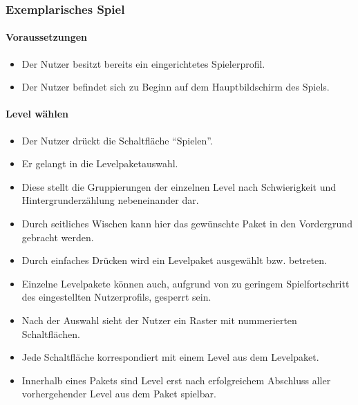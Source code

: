 \subsubsection{Exemplarisches Spiel}
\paragraph{Voraussetzungen}\mbox{}\newline
\begin{itemize}
\item Der Nutzer besitzt bereits ein eingerichtetes Spielerprofil.
\item Der Nutzer befindet sich zu Beginn auf dem Hauptbildschirm des Spiels.
\end{itemize}

\paragraph{Level wählen}\mbox{}\newline
\begin{itemize}
\item Der Nutzer drückt die Schaltfläche "`Spielen"'.
\item Er gelangt in die Levelpaketauswahl.
\item Diese stellt die Gruppierungen der einzelnen Level nach Schwierigkeit und 
Hintergrunderzählung nebeneinander dar. 
\item Durch seitliches Wischen kann hier das gewünschte Paket in den Vordergrund gebracht werden.
\item Durch einfaches Drücken wird ein Levelpaket ausgewählt bzw. betreten.
\item Einzelne Levelpakete können auch, aufgrund von zu geringem Spielfortschritt des 
eingestellten Nutzerprofils, gesperrt sein.
\item Nach der Auswahl sieht der Nutzer ein Raster mit nummerierten Schaltflächen.
\item Jede Schaltfläche korrespondiert mit einem Level aus dem Levelpaket.
\item Innerhalb eines Pakets sind Level erst nach erfolgreichem Abschluss aller vorhergehender Level aus dem Paket spielbar.
\end{itemize}

